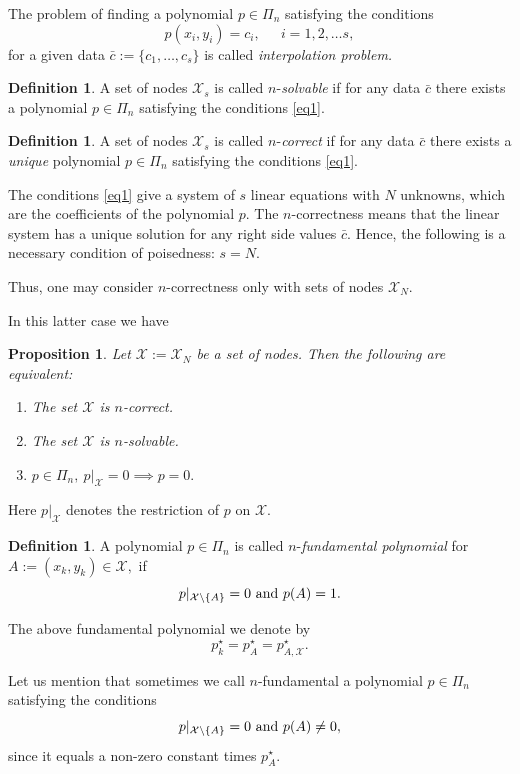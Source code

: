 \documentclass[a4paper,12pt]{article}
\newtheorem{proposition}[lemma]{Proposition}
\theoremstyle{definition}
\newtheorem{definition}[lemma]{Definition}
\numberwithin{equation}{section}
\numberwithin{figure}{section}
\newcommand{\Xset}{\mathcal{X}}
\begin{document}
The problem of finding a polynomial $p \in \Pi_n$ satisfying the conditions
\begin{equation}\label{eq1}
p(x_i, y_i) = c_i, \ \ \quad i = 1, 2, \dots s  ,
\end{equation}
for a given data $\bar c:=\{c_1, \dots, c_s\}$ is called \emph{interpolation problem.}
\begin{definition}
A set of nodes $\Xset_s$ is called
$n$-\emph{solvable} if for any data $\bar c$ there exists a
polynomial $p \in \Pi_n$ satisfying the conditions
\eqref{eq1}.
\end{definition}
\begin{definition}
A set of nodes $\Xset_s$ is called
$n$-\emph{correct} if for any data $\bar c$ there exists a
\emph{unique} polynomial $p \in \Pi_n$ satisfying the conditions
\eqref{eq1}.
\end{definition}

The conditions \eqref{eq1} give a system of $s$ linear equations with $N$ unknowns, which are the coefficients of the polynomial $p.$ The $n$-correctness means that the linear system has a unique
solution for any right side values $\bar c.$ Hence, the following is a necessary condition of poisedness: $s = N.$

Thus, one may consider $n$-correctness only with sets of nodes $\Xset_N.$ 

In this latter case we have
\begin{proposition} \label{correctii}
Let $\Xset:=\Xset_N$ be a set of nodes. Then the following are equivalent:
\begin{enumerate}
\item
The set $\Xset$ is $n$-correct.
\item
The set $\Xset$ is $n$-solvable.
\item
$p \in \Pi_n,\ p|_\Xset=0\implies p = 0.$
\end{enumerate}
\end{proposition}
Here $p|_\Xset$ denotes the restriction of $p$ on $\Xset.$


\begin{definition}
A polynomial $p \in \Pi_n$ is called $n$-\emph{fundamental polynomial}
for $A := (x_k, y_k) \in \Xset,$  if
$$ p|_{\Xset\setminus\{A\}}=0\ \hbox{and}\ p(A)=1.$$
\end{definition}
The above fundamental polynomial we denote by 
$$p_k^\star=p_A^\star=p_{A,\Xset}^\star.$$

Let us mention that sometimes we call $n$-fundamental a polynomial $p\in \Pi_n$ satisfying the conditions
$$ p|_{\Xset\setminus\{A\}}= 0\ \hbox{and}\ p(A)\neq 0,$$
since it equals a non-zero constant times $p_A^\star.$
\end{document}
